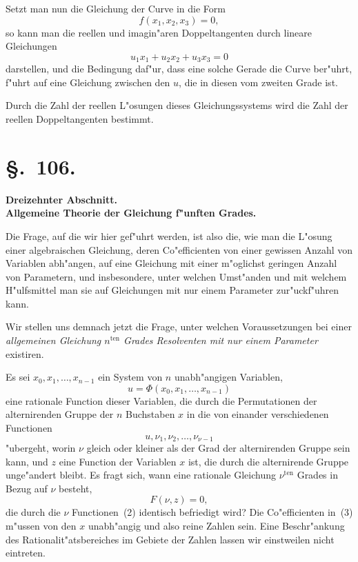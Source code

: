 \documentclass[12pt,a4paper]{article}
\theoremstyle{plain}
\begin{document}
Setzt man nun die Gleichung der Curve in die Form
\[f(x_1,x_2,x_3)=0,\]
so kann man die reellen und imagin"aren Doppeltangenten durch lineare Gleichungen
\[u_1 x_1 + u_2 x_2 + u_3 x_3 = 0\]
 darstellen, und die Bedingung daf"ur, dass eine solche Gerade die Curve ber"uhrt, f"uhrt auf eine Gleichung zwischen den $u$, die in diesen vom zweiten Grade ist.

Durch die Zahl der reellen L"osungen dieses Gleichungssystems wird die Zahl der reellen Doppeltangenten bestimmt.

\newpage
\section*{\S.~106.}
\begin{center}
\large\bfseries Dreizehnter Abschnitt.\\[0.5em]
Allgemeine Theorie der Gleichung f"unften Grades.
\end{center}
\vspace{0.5em}

Die Frage, auf die wir hier gef"uhrt werden, ist also die, wie man die L"osung einer algebraischen Gleichung, deren Co"efficienten von einer gewissen Anzahl von Variablen abh"angen, auf eine Gleichung mit einer m"oglichst geringen Anzahl von Parametern, und insbesondere, unter welchen Umst"anden und mit welchem H"ulfsmittel man sie auf Gleichungen mit nur einem Parameter zur"uckf"uhren kann.

Wir stellen uns demnach jetzt die Frage, unter welchen Voraussetzungen bei einer \emph{allgemeinen Gleichung $n^{\text{ten}}$ Grades Resolventen mit nur einem Parameter} existiren.

Es sei $x_0, x_1, \ldots, x_{n-1}$ ein System von $n$ unabh"angigen Variablen,
\begin{equation}\tag{1}
u = \varPhi(x_0, x_1, \ldots, x_{n-1})
\end{equation}
eine rationale Function dieser Variablen, die durch die Permutationen der alternirenden Gruppe der $n$ Buchstaben $x$ in die von einander verschiedenen Functionen
\begin{equation}\tag{2}
u, \nu_1, \nu_2, \ldots, \nu_{\nu-1}
\end{equation}
"ubergeht, worin $\nu$ gleich oder kleiner als der Grad der alternirenden Gruppe sein kann, und $z$ eine Function der Variablen $x$ ist, die durch die alternirende Gruppe unge"andert bleibt. Es fragt sich, wann eine rationale Gleichung $\nu^{\text{ten}}$ Grades in Bezug auf $\nu$ besteht,
\begin{equation}\tag{3}
F(\nu, z) = 0,
\end{equation}
die durch die $\nu$ Functionen~(2) identisch befriedigt wird? Die Co"efficienten in~(3) m"ussen von den $x$ unabh"angig und also reine Zahlen sein. Eine Beschr"ankung des Rationalit"atsbereiches im Gebiete der Zahlen lassen wir einstweilen nicht eintreten.
\end{document}
